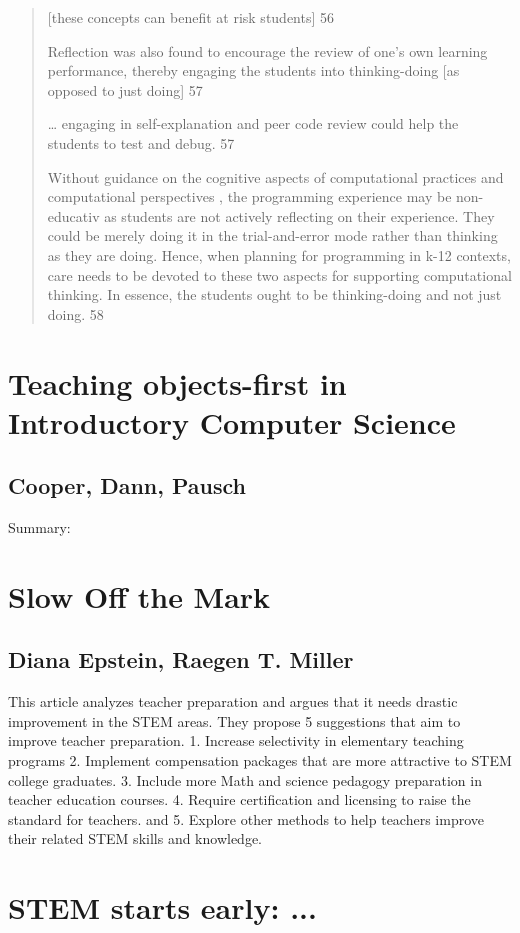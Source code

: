 \documentclass[12pt]{extarticle}
\begin{document}
{\begin{quote}
    [these concepts can benefit at risk students] 56
    
    Reflection was also found to encourage the review of one’s own learning performance, thereby engaging the students into thinking-doing [as opposed to just doing] 57
    
    … engaging in self-explanation and peer code review could help the students to test and debug. 57
    
    Without guidance on the cognitive aspects of computational practices and computational perspectives , the programming experience may be non-educativ as students are not actively reflecting on their experience. They could be merely doing it in the trial-and-error mode rather than thinking as they are doing. Hence, when planning for programming in k-12 contexts, care needs to be devoted to these two aspects for supporting computational thinking. In essence, the students ought to be thinking-doing and not just doing. 58
\end{quote}

\section*{Teaching objects-first in Introductory Computer Science}
\subsection*{Cooper, Dann, Pausch}
Summary:


\section*{Slow Off the Mark}
\subsection*{Diana Epstein, Raegen T. Miller}
This article analyzes teacher preparation and argues that it needs drastic improvement in the STEM areas. They propose 5 suggestions that aim to improve teacher preparation. 1. Increase selectivity in elementary teaching programs 2. Implement compensation packages that are more attractive to STEM college graduates. 3. Include more Math and science pedagogy preparation in teacher education courses. 4. Require certification and licensing to raise the standard for teachers. and 5. Explore other methods to help teachers improve their related STEM skills and knowledge.

\section*{STEM starts early: ...}
}
\end{document}
